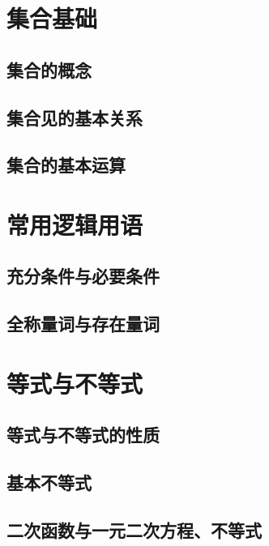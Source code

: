 \documentclass[../main.tex]{subfiles}
\begin{document}
\section{集合基础}

\subsection{集合的概念}

\subsection{集合见的基本关系}

\subsection{集合的基本运算}

\section{常用逻辑用语}

\subsection{充分条件与必要条件}

\subsection{全称量词与存在量词}

\section{等式与不等式}

\subsection{等式与不等式的性质}

\subsection{基本不等式}

\subsection{二次函数与一元二次方程、不等式}
\end{document}
